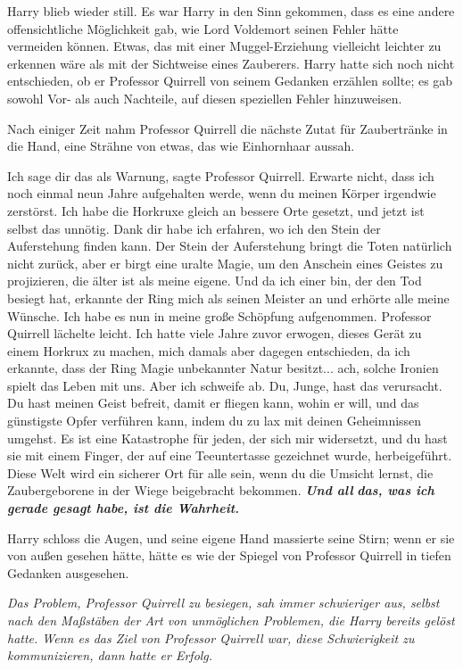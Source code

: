 Harry blieb wieder still. Es war Harry in den Sinn gekommen, dass es eine andere
offensichtliche Möglichkeit gab, wie Lord Voldemort seinen Fehler hätte
vermeiden können. Etwas, das mit einer Muggel-Erziehung vielleicht leichter zu
erkennen wäre als mit der Sichtweise eines Zauberers. Harry hatte sich noch
nicht entschieden, ob er Professor Quirrell von seinem Gedanken erzählen sollte;
es gab sowohl Vor- als auch Nachteile, auf diesen speziellen Fehler hinzuweisen.

Nach einiger Zeit nahm Professor Quirrell die nächste Zutat für Zaubertränke in
die Hand, eine Strähne von etwas, das wie Einhornhaar aussah.

\glqq{}Ich sage dir das als Warnung\grqq{}, sagte Professor Quirrell. \glqq{}
Erwarte nicht, dass ich noch einmal neun Jahre aufgehalten werde, wenn du meinen
Körper irgendwie zerstörst. Ich habe die Horkruxe gleich an bessere Orte
gesetzt, und jetzt ist selbst das unnötig. Dank dir habe ich erfahren, wo ich
den Stein der Auferstehung finden kann. Der Stein der Auferstehung bringt die
Toten natürlich nicht zurück, aber er birgt eine uralte Magie, um den Anschein
eines Geistes zu projizieren, die älter ist als meine eigene. Und da ich einer
bin, der den Tod besiegt hat, erkannte der Ring mich als seinen Meister an und
erhörte alle meine Wünsche. Ich habe es nun in meine große Schöpfung
aufgenommen.\grqq{} Professor Quirrell lächelte leicht. \glqq{}Ich hatte viele Jahre
zuvor erwogen, dieses Gerät zu einem Horkrux zu machen, mich damals aber dagegen
entschieden, da ich erkannte, dass der Ring Magie unbekannter Natur besitzt...
ach, solche Ironien spielt das Leben mit uns. Aber ich schweife ab. Du, Junge,
hast das verursacht. Du hast meinen Geist befreit, damit er fliegen kann, wohin
er will, und das günstigste Opfer verführen kann, indem du zu lax mit deinen
Geheimnissen umgehst. Es ist eine Katastrophe für jeden, der sich mir
widersetzt, und du hast sie mit einem Finger, der auf eine Teeuntertasse
gezeichnet wurde, herbeigeführt. Diese Welt wird ein sicherer Ort für alle sein,
wenn du die Umsicht lernst, die Zaubergeborene in der Wiege beigebracht
bekommen. \textbf{\emph{Und all} }\textbf{\emph{das, was ich gerade gesagt habe,
ist die Wahrheit.}}\grqq{}

Harry schloss die Augen, und seine eigene Hand massierte seine Stirn; wenn er
sie von außen gesehen hätte, hätte es wie der Spiegel von Professor Quirrell in
tiefen Gedanken ausgesehen.

\emph{Das Problem, Professor Quirrell zu besiegen, sah immer schwieriger aus,
selbst nach den Maßstäben der Art von unmöglichen Problemen, die Harry bereits
gelöst hatte. Wenn es das Ziel von Professor Quirrell war, diese Schwierigkeit
zu kommunizieren, dann hatte er Erfolg.}

